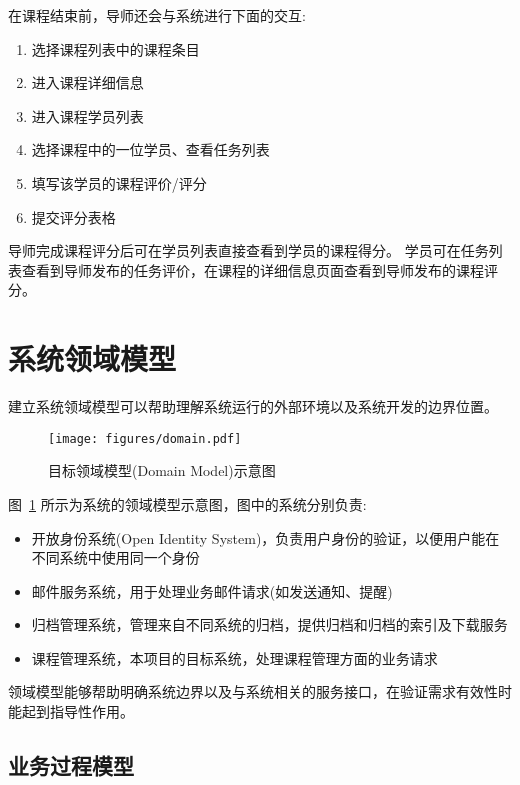 在课程结束前，导师还会与系统进行下面的交互:

\begin{enumerate}
  \item 选择课程列表中的课程条目
  \item 进入课程详细信息
  \item 进入课程学员列表
  \item 选择课程中的一位学员、查看任务列表
  \item 填写该学员的课程评价/评分
  \item 提交评分表格
\end{enumerate}

导师完成课程评分后可在学员列表直接查看到学员的课程得分。 学员可在任务列表查看到导师发布的任务评价，在课程的详细信息页面查看到导师发布的课程评分。

\section{系统领域模型}

建立系统领域模型可以帮助理解系统运行的外部环境以及系统开发的边界位置。

\begin{figure}[!h]
  \begin{center}
    \texttt{[image: figures/domain.pdf]}
    \caption{目标领域模型(Domain Model)示意图\label{DomainModel}}
  \end{center}
\end{figure}

图~\ref{DomainModel} 所示为系统的领域模型示意图，图中的系统分别负责:

\begin{itemize}
  \item 开放身份系统(Open Identity System)，负责用户身份的验证，以便用户能在不同系统中使用同一个身份
  \item 邮件服务系统，用于处理业务邮件请求(如发送通知、提醒)
  \item 归档管理系统，管理来自不同系统的归档，提供归档和归档的索引及下载服务
  \item 课程管理系统，本项目的目标系统，处理课程管理方面的业务请求
\end{itemize}

领域模型能够帮助明确系统边界以及与系统相关的服务接口，在验证需求有效性时能起到指导性作用。

\subsection{业务过程模型}

